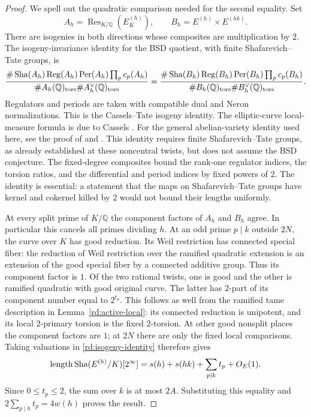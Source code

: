 \begin{proof}
We spell out the quadratic comparison needed for
the second equality.  Set
\[
 A_h=\operatorname{Res}_{K/\mathbb Q}(E^{(h)}_K),
 \qquad B_h=E^{(h)}\times E^{(hk)}.
 \]
There are isogenies in both directions whose
composites are multiplication by \(2\).
The isogeny-invariance identity for the BSD quotient,
with finite Shafarevich--Tate groups, is
\begin{equation}
 \frac{\#\operatorname{Sha}(A_h)\operatorname{Reg}(A_h)
             \operatorname{Per}(A_h)\prod_p c_p(A_h)}
      {\#A_h(\mathbb Q)_{\rm tors}
       \#A_h^\vee(\mathbb Q)_{\rm tors}}
 =
 \frac{\#\operatorname{Sha}(B_h)\operatorname{Reg}(B_h)
             \operatorname{Per}(B_h)\prod_p c_p(B_h)}
      {\#B_h(\mathbb Q)_{\rm tors}
       \#B_h^\vee(\mathbb Q)_{\rm tors}} .
 \label{rd:isogeny-identity}
\end{equation}
Regulators and periods are taken with compatible
dual and Neron normalizations.  This is the
Cassels--Tate isogeny identity.  The elliptic-curve local-measure
formula is due to Cassels \cite[Theorem~1.1]{Cassels1965}.
For the general abelian-variety identity used here, see the proof of
\cite[I, Theorem~7.3, especially (7.3.1), pp.~97--100]{MilneADT2006}
and \cite[Section~4.1]{DokchitserDokchitser2010}.  This identity requires
finite Shafarevich--Tate groups, as already established at these
noncentral twists, but does not assume the BSD conjecture.
The fixed-degree composites bound the rank-one
regulator indices, the torsion ratios, and the
differential and period indices by fixed powers
of \(2\).  The identity is essential: a statement
that the maps on Shafarevich--Tate groups have
kernel and cokernel killed by \(2\) would not
bound their lengths uniformly.

At every split prime of \(K/\mathbb Q\) the component
factors of \(A_h\) and \(B_h\) agree.  In particular
this cancels all primes dividing \(h\).
At an odd prime \(p\mid k\) outside \(2N\), the curve
over \(K\) has good reduction.  Its Weil restriction
has connected special fiber: the reduction of
Weil restriction over the ramified quadratic
extension is an extension of the good special
fiber by a connected additive group.  Thus its
component factor is \(1\).  Of the two rational
twists, one is good and the other is ramified
quadratic with good original curve.  The latter
has \(2\)-part of its component number equal to
\(2^{t_p}\).  This follows as well from the
ramified tame description in
Lemma~\ref{rd:active-local}: its connected
reduction is unipotent, and its local
\(2\)-primary torsion is the fixed
\(2\)-torsion.  At other good nonsplit places
the component factors are \(1\); at \(2N\)
there are only the fixed local comparisons.
Taking valuations in \eqref{rd:isogeny-identity}
therefore gives
\begin{equation}
 \operatorname{length}\operatorname{Sha}(E^{(h)}/K)[2^\infty]
 =s(h)+s(hk)+\sum_{p\mid k}t_p+O_E(1).
 \label{rd:sha-comparison}
\end{equation}
Since \(0\le t_p\le2\), the sum over \(k\) is at
most \(2A\).  Substituting this equality and
\(2\sum_{p\mid h}t_p=4w(h)\) proves the result.
\end{proof}

